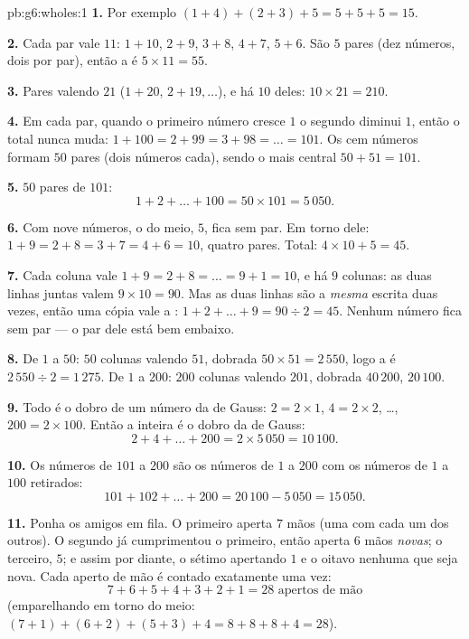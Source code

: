 \begin{solution}{pb:g6:wholes:1}
\textbf{1.} Por exemplo $(1 + 4) + (2 + 3) + 5 = 5 + 5 + 5 = 15$.

\textbf{2.} Cada par vale $11$: $1 + 10$, $2 + 9$, $3 + 8$, $4 + 7$,
$5 + 6$. São $5$ pares (dez números, dois por par), então a  é
$5 \times 11 = 55$.

\textbf{3.} Pares valendo $21$ ($1 + 20$, $2 + 19, \dots$), e há $10$
deles: $10 \times 21 = 210$.

\textbf{4.} Em cada par, quando o primeiro número cresce $1$ o segundo
diminui $1$, então o total nunca muda:
$1 + 100 = 2 + 99 = 3 + 98 = \dots = 101$. Os cem números formam $50$
pares (dois números cada), sendo o mais central $50 + 51 = 101$.

\textbf{5.} $50$ pares de $101$:
\[
1 + 2 + \dots + 100 = 50 \times 101 = 5\,050 .
\]

\textbf{6.} Com nove números, o do meio, $5$, fica sem par. Em torno
dele: $1 + 9 = 2 + 8 = 3 + 7 = 4 + 6 = 10$, quatro pares. Total:
$4 \times 10 + 5 = 45$.

\textbf{7.} Cada coluna vale $1 + 9 = 2 + 8 = \dots = 9 + 1 = 10$, e há
$9$ colunas: as duas linhas juntas valem $9 \times 10 = 90$. Mas as duas
linhas são a \emph{mesma}  escrita duas vezes, então uma cópia vale
a : $1 + 2 + \dots + 9 = 90 \div 2 = 45$. Nenhum número fica sem
par --- o par dele está bem embaixo.

\textbf{8.} De $1$ a $50$: $50$ colunas valendo $51$,  dobrada
$50 \times 51 = 2\,550$, logo a  é $2\,550 \div 2 = 1\,275$. De $1$
a $200$: $200$ colunas valendo $201$,  dobrada $40\,200$, 
$20\,100$.

\textbf{9.} Todo  é o dobro de um número da  de Gauss:
$2 = 2 \times 1$, $4 = 2 \times 2$, \dots, $200 = 2 \times 100$. Então a
 inteira é o dobro da de Gauss:
\[
2 + 4 + \dots + 200 = 2 \times 5\,050 = 10\,100 .
\]

\textbf{10.} Os números de $101$ a $200$ são os números de $1$ a $200$
com os números de $1$ a $100$ retirados:
\[
101 + 102 + \dots + 200 = 20\,100 - 5\,050 = 15\,050 .
\]

\textbf{11.} Ponha os amigos em fila. O primeiro aperta $7$ mãos (uma
com cada um dos outros). O segundo já cumprimentou o primeiro, então
aperta $6$ mãos \emph{novas}; o terceiro, $5$; e assim por diante, o
sétimo apertando $1$ e o oitavo nenhuma que seja nova. Cada aperto de
mão é contado exatamente uma vez:
\[
7 + 6 + 5 + 4 + 3 + 2 + 1 = 28 \text{ apertos de mão}
\]
(emparelhando em torno do meio: $(7+1) + (6+2) + (5+3) + 4 =
8 + 8 + 8 + 4 = 28$).


\end{solution}
